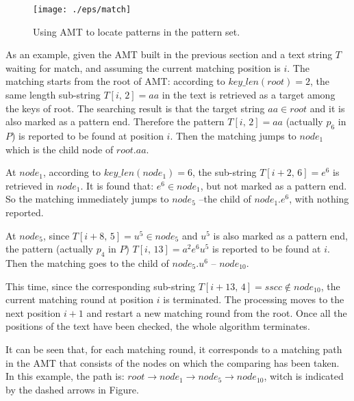 \documentclass[legalpaper]{article}
\begin{document}

\begin{figure}[htbp]
  \centering
  \texttt{[image: ./eps/match]}
  \caption{Using AMT to locate patterns in the pattern set.}
  \label{fig:2}
\end{figure} 

As an example, given the \textsf{AMT} built in the previous section
and a text string $T$ waiting for match, and assuming the current
matching position is $i$. The matching starts from the root of
\textsf{AMT}: according to $key\_len(root)=2$, the same length
sub-string $T[i,\,2]=aa$ in the text is retrieved as a target among
the keys of root. The searching result is that the target string $aa
\in root$ and it is also marked as a pattern end. Therefore the
pattern $T[i,\,2]=aa$ (actually $p_6$ in $P$) is reported to be found
at position $i$. Then the matching jumps to $node_1$ which is the
child node of $root.aa$.

At $node_1$, according to $key\_len(node_1)=6$, the sub-string
$T[i+2,\,6]=e^6$ is retrieved in $node_1$. It is found that: $e^6 \in
node_1$, but not marked as a pattern end. So the matching immediately
jumps to $node_5$ --the child of $node_1.e^6$, with nothing reported.
 
At $node_5$, since $T[i+8,\,5]=u^5 \in node_5$ and $u^5$ is also
marked as a pattern end, the pattern (actually $p_4$ in $P$)
$T[i,\,13]=a^2e^6u^5$ is reported to be found at $i$. Then the
matching goes to the child of $node_5.u^6$ -- $node_{10}$.

This time, since the corresponding sub-string $T[i+13,\,4]=sscc \notin
node_{10}$, the current matching round at position $i$ is
terminated. The processing moves to the next position $i+1$ and
restart a new matching round from the root. Once all the positions of
the text have been checked, the whole algorithm terminates.

It can be seen that, for each matching round, it corresponds to a
\textsf{matching path} in the \textsf{AMT} that consists of the nodes
on which the comparing has been taken. In this example, the path is:
$root \rightarrow node_1 \rightarrow node_5 \rightarrow node_{10}$,
witch is indicated by the dashed arrows in Figure.

\end{document}
